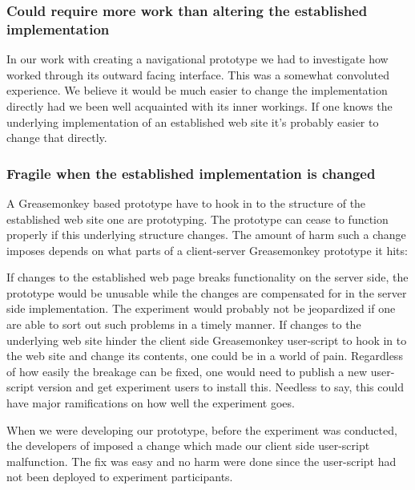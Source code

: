 \subsubsection{Could require more work than altering the established
  implementation}

In our work with creating a navigational prototype we had to investigate how
\urort{} worked through its outward facing interface. This was a somewhat
convoluted experience.
We believe it would be much easier to change the \urort{} implementation
directly had we been well acquainted with its inner workings.
If one knows the underlying implementation of an established web site it's
probably easier to change that directly.

\subsubsection{Fragile when the established implementation is changed}

A Greasemonkey based prototype have to hook in to the structure of the
established web site one are prototyping. The prototype can cease to function
properly if this underlying structure changes. The amount of harm such a
change imposes depends on what parts of a client-server Greasemonkey prototype
it hits:

\begin{items}
   If changes to the established web page breaks
    functionality on the server side, the prototype would be unusable
    while the changes are compensated for in the server side implementation.
    The experiment would probably not be jeopardized if
    one are able to sort out such problems in a timely manner.
   If changes to the underlying web site hinder the client
    side Greasemonkey user-script to hook in to the web site and change its
    contents, one could be in a world of pain. Regardless of how easily the
    breakage can be fixed, one would need to publish a new user-script version
    and get experiment users to install this. Needless to say, this could
    have major ramifications on how well the experiment goes.
\end{items}

When we were developing our prototype, before the experiment was conducted,
the developers of \urort{} imposed a change which made our client side
user-script malfunction. The fix was easy and no harm were done since the
user-script had not been deployed to experiment participants.


